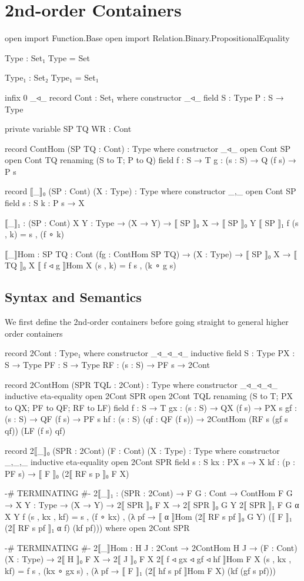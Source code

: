 \section{2nd-order Containers}

\begin{code}[hide]

open import Function.Base
open import Relation.Binary.PropositionalEquality

Type : Set₁
Type = Set

Type₁ : Set₂
Type₁ = Set₁

infix  0 _◃_
record Cont : Set₁ where
  constructor _◃_
  field
    S : Type
    P : S → Type

private variable SP TQ WR : Cont

record ContHom (SP TQ : Cont) : Type where
  constructor _◃_
  open Cont SP
  open Cont TQ renaming (S to T; P to Q)
  field
    f : S → T
    g : (s : S) → Q (f s) → P s

record ⟦_⟧₀ (SP : Cont) (X : Type) : Type where
  constructor _,_
  open Cont SP
  field
    s : S
    k : P s → X

⟦_⟧₁ : (SP : Cont) {X Y : Type} → (X → Y) → ⟦ SP ⟧₀ X → ⟦ SP ⟧₀ Y
⟦ SP ⟧₁ f (s , k) = s , (f ∘ k)

⟦_⟧Hom : {SP TQ : Cont} (fg : ContHom SP TQ)
  → (X : Type) → ⟦ SP ⟧₀ X → ⟦ TQ ⟧₀ X
⟦ f ◃ g ⟧Hom X (s , k) = f s , (k ∘ g s)
\end{code}

\subsection{Syntax and Semantics}

We first define the 2nd-order containers before going straight to general higher order containers

\begin{code}
record 2Cont : Type₁ where
  constructor _◃_◃_◃_
  inductive
  field
    S : Type
    PX : S → Type
    PF : S → Type
    RF : (s : S) → PF s → 2Cont

record 2ContHom (SPR TQL : 2Cont) : Type where
  constructor _◃_◃_◃_
  inductive
  eta-equality
  open 2Cont SPR
  open 2Cont TQL renaming (S to T; PX to QX; PF to QF; RF to LF)
  field
    f : S → T
    gx : (s : S) → QX (f s) → PX s
    gf : (s : S) → QF (f s) → PF s
    hf : (s : S) (qf : QF (f s)) → 2ContHom (RF s (gf s qf)) (LF (f s) qf) 

record 2⟦_⟧₀ (SPR : 2Cont) (F : Cont) (X : Type) : Type where
  constructor _,_,_
  inductive
  eta-equality
  open 2Cont SPR
  field
    s : S
    kx : PX s → X
    kf : (p : PF s) → ⟦ F ⟧₀ (2⟦ RF s p ⟧₀ F X)

{-# TERMINATING #-}
2⟦_⟧₁ : (SPR : 2Cont)
  → {F G : Cont} → ContHom F G
  → {X Y : Type} → (X → Y)
  → 2⟦ SPR ⟧₀ F X → 2⟦ SPR ⟧₀ G Y
2⟦ SPR ⟧₁ {F} {G} α {X} {Y} f (s , kx , kf) = s , (f ∘ kx)
   , (λ pf → ⟦ α ⟧Hom (2⟦ RF s pf ⟧₀ G Y) (⟦ F ⟧₁ (2⟦ RF s pf ⟧₁ α f) (kf pf)))
  where open 2Cont SPR

{-# TERMINATING #-}
2⟦_⟧Hom : {H J : 2Cont} → 2ContHom H J
  → (F : Cont) (X : Type)
  → 2⟦ H ⟧₀ F X → 2⟦ J ⟧₀ F X
2⟦ f ◃ gx ◃ gf ◃ hf ⟧Hom F X (s , kx , kf) = f s , (kx ∘ gx s)
  , (λ pf → ⟦ F ⟧₁ (2⟦ hf s pf ⟧Hom F X) (kf (gf s pf)))
\end{code}